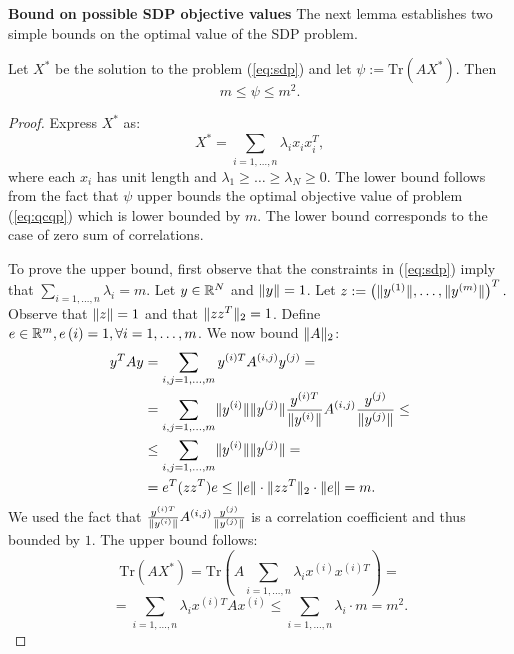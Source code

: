 \noindent\textbf{Bound on possible SDP objective values}
The next lemma establishes two simple bounds on the optimal value of the SDP problem.
\begin{lemma}\label{eq:lemsdp}
Let $X^*$ be the solution to the problem (\ref{eq:sdp}) and let $\psi := \mathrm{Tr}\left(A X^{*}\right)$. Then
$$m \leq \psi \leq m^2.$$
\end{lemma}
\begin{proof}
Express $X^*$ as:
$$X^* =  \underset{i=1,\ldots, n}{\sum} \lambda_i x_i x_i^T,$$
where each $x_i$ has unit length and $\lambda_1 \geq \ldots \geq \lambda_N \geq 0$.
The lower bound follows from the fact that $\psi$ upper bounds the optimal objective
value of problem (\ref{eq:qcqp}) which is lower bounded by $m$. The lower bound corresponds
to the case of zero sum of correlations.

To prove the upper bound, first observe that the constraints in (\ref{eq:sdp})
imply that $\underset{i=1,\ldots, n}{\sum}\lambda_i = m$.
Let $y \in \mathbb{R}^{N}$ and $\lVert y\rVert = 1$.
Let $z := \left(\lVert y^{(1)}\rVert, \ldots, \lVert y^{(m)}\rVert\right)^T.$
Observe that $\lVert z\rVert = 1$ and that $\lVert z z^T\rVert_2 = 1$.
Define $e \in \mathbb{R}^m, e\left(i\right) = 1,  \forall i=1,\ldots,m$.
We now bound $\lVert A\rVert_2$:
\begin{align*}
  y^T A y &= \sum_{i, j = 1,\ldots,m} y^{(i)T} A^{(i,j)} y^{(j)} = \\
& = \sum_{i, j = 1,\ldots,m} \lVert y^{(i)}\rVert \lVert y^{(j)}\rVert \frac{y^{(i)T}}{\lVert y^{(i)}\rVert} A^{(i,j)} \frac{y^{(j)}}{\lVert y^{(j)}\rVert} \leq \\
&\leq \sum_{i, j = 1,\ldots,m} \lVert y^{(i)}\rVert \lVert y^{(j)}\rVert = \\
&= e^T (z z^T) e \leq \lVert e\rVert\cdot \lVert z z^T\rVert_2 \cdot \lVert e\rVert = m.
\end{align*}
We used the fact that $\frac{y^{(i)T}}{\lVert y^{(i)}\rVert} A^{(i,j)} \frac{y^{(j)}}{\lVert y^{(j)}\rVert}$
is a correlation coefficient and thus bounded by $1$.
The upper bound follows:
$$\mathrm{Tr}\left(A X^{*}\right) = \mathrm{Tr}\left(A  \underset{i=1,\ldots, n}{\sum} \lambda_i x^{(i)} x^{(i)T}\right) =$$
$$=  \underset{i=1,\ldots, n}{\sum} \lambda_i x^{(i)T} A x^{(i)} \leq \underset{i=1,\ldots, n}{\sum} \lambda_i \cdot m = m^2.$$
\end{proof}

